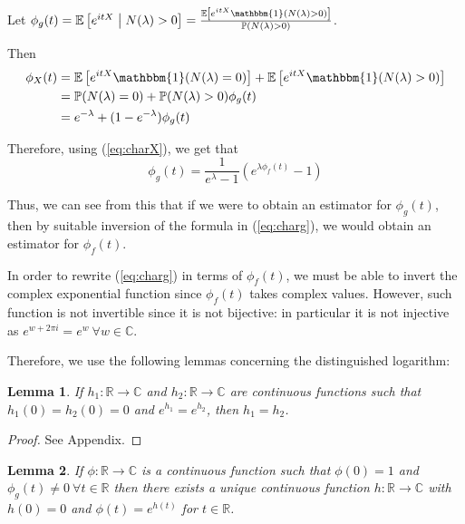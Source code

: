 \documentclass[a4paper,11pt]{article}
\theoremstyle{theorem}
\newtheorem{lem}{Lemma}[section]
\theoremstyle{definition}
\theoremstyle{remark}
\providecommand{\E}{\mathbb{E}}
\begin{document}
Let $\phi_{g}(t) = \E \left[ e^{itX} \;\middle|\; N(\lambda) > 0 \right] = \frac{\E \left[ e^{itX} \mathbbm{1}(N(\lambda) > 0) \right]}{\mathbb{P}(N(\lambda) > 0)}$.

Then
\begin{align*}
\phi_{X}(t) &= \E \left[ e^{itX} \mathbbm{1}(N(\lambda) = 0) \right] + \E \left[ e^{itX} \mathbbm{1}(N(\lambda) > 0) \right] \\
            &= \mathbb{P}(N(\lambda) = 0) + \mathbb{P}(N(\lambda) > 0) \phi_{g}(t) \\
            &= e^{-\lambda} + (1 - e^{-\lambda})\phi_{g}(t)
\end{align*}

Therefore, using (\ref{eq:charX}), we get that
\begin{equation}
\phi_{g}(t) = \frac{1}{e^{\lambda} - 1}(e^{\lambda \phi_{f}(t)} - 1) \label{eq:charg}
\end{equation}

Thus, we can see from this that if we were to obtain an estimator for $\phi_{g}(t)$, then by suitable inversion of the formula in (\ref{eq:charg}), we would obtain an estimator for $\phi_{f}(t)$.

In order to rewrite (\ref{eq:charg}) in terms of $\phi_{f}(t)$, we must be able to invert the complex exponential function since $\phi_{f}(t)$ takes complex values. However, such function is not invertible since it is not bijective: in particular it is not injective as $e^{w + 2 \pi i} = e^{w} \ \forall w \in \mathbb{C}$.

Therefore, we use the following lemmas concerning the distinguished logarithm:

\begin{lem} \label{lma1}
If $h_{1} : \mathbb{R} \to \mathbb{C}$ and $h_{2} : \mathbb{R} \to \mathbb{C}$ are continuous functions such that $h_{1}(0) = h_{2}(0) = 0$ and $e^{h_{1}} = e^{h_{2}}$, then $h_{1} = h_{2}$. 
\end{lem}

\begin{proof}
See Appendix.
\end{proof}

\begin{lem} \label{lma2}
If $\phi : \mathbb{R} \to \mathbb{C}$ is a continuous function such that $\phi(0) = 1$ and $\phi_{g}(t) \neq 0 \ \forall t \in \mathbb{R}$ then there exists a unique continuous function $h : \mathbb{R} \to \mathbb{C}$ with $h(0) = 0$ and $\phi(t) = e^{h(t)}$ for $t \in \mathbb{R}$. 
\end{lem}
\end{document}

